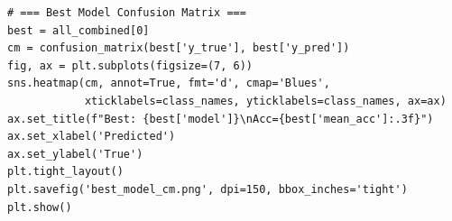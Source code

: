 \begin{lstlisting}
# === Best Model Confusion Matrix ===
best = all_combined[0]
cm = confusion_matrix(best['y_true'], best['y_pred'])
fig, ax = plt.subplots(figsize=(7, 6))
sns.heatmap(cm, annot=True, fmt='d', cmap='Blues',
            xticklabels=class_names, yticklabels=class_names, ax=ax)
ax.set_title(f"Best: {best['model']}\nAcc={best['mean_acc']:.3f}")
ax.set_xlabel('Predicted')
ax.set_ylabel('True')
plt.tight_layout()
plt.savefig('best_model_cm.png', dpi=150, bbox_inches='tight')
plt.show()
\end{lstlisting}
 
